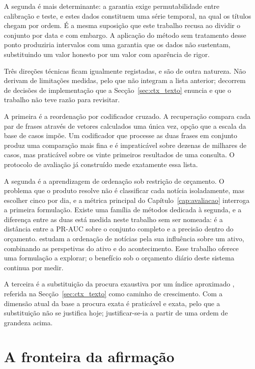 A segunda é mais determinante: a garantia exige
permutabilidade entre calibração e teste, e estes dados constituem uma série temporal, na qual os
títulos chegam por ordem. É a mesma suposição que este trabalho recusa ao dividir o conjunto por data
e com embargo. A aplicação do método sem tratamento desse ponto produziria intervalos com uma
garantia que os dados não sustentam, substituindo um valor honesto por um valor com aparência de
rigor.

Três direções técnicas ficam igualmente registadas, e são de outra natureza. Não derivam de
limitações medidas, pelo que não integram a lista anterior; decorrem de decisões de implementação
que a Secção~\ref{sec:ctx_texto} enuncia e que o trabalho não teve razão para revisitar.

A primeira é a reordenação por codificador cruzado. A recuperação compara cada par de frases
através de vetores calculados uma única vez, opção que a escala da base de casos impõe. Um
codificador que processe as duas frases em conjunto produz uma comparação mais fina e é
impraticável sobre dezenas de milhares de casos, mas praticável sobre os vinte primeiros
resultados de uma consulta. O protocolo de avaliação já construído mede exatamente essa lista.

A segunda é a aprendizagem de ordenação sob restrição de orçamento. O problema que o produto
resolve não é classificar cada notícia isoladamente, mas escolher cinco por dia, e a métrica
principal do Capítulo~\ref{cap:avaliacao} interroga a primeira formulação. Existe uma família de
métodos dedicada à segunda, e a diferença entre as duas está medida neste trabalho sem ser
nomeada: é a distância entre a PR-AUC sobre o conjunto completo e a precisão dentro do orçamento.
\textcite{feng2021hybrid} estudam a ordenação de notícias pela sua influência sobre um ativo,
combinando as perspetivas do ativo e do acontecimento. Esse trabalho oferece uma formulação a
explorar; o benefício sob o orçamento diário deste sistema continua por medir.

A terceira é a substituição da procura exaustiva por um índice aproximado
\autocite{johnson2021faiss}, referida na Secção~\ref{sec:ctx_texto} como caminho de
crescimento. Com a dimensão atual da base a procura exata é praticável e exata, pelo que a
substituição não se justifica hoje; justificar-se-ia a partir de uma ordem de grandeza acima.

\section{A fronteira da afirmação}
\label{sec:con_final}

